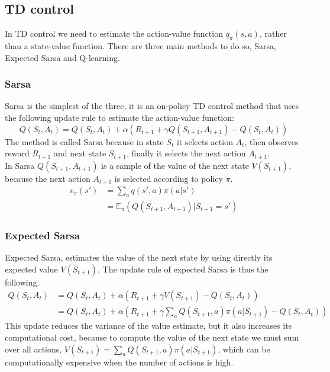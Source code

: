 \subsection{TD control}
In TD control we need to estimate the action-value function $q_{\pi}(s, a)$, rather than a state-value function. There are three main methods to do so, Sarsa, Expected Sarsa and Q-learning.

\subsubsection{Sarsa}
Sarsa is the simplest of the three, it is an on-policy TD control method that uses the following update rule to estimate the action-value function:
\begin{equation}
    Q(S_t, A_t) = Q(S_t, A_t) + \alpha (R_{t+1} + \gamma Q(S_{t+1}, A_{t+1}) - Q(S_t, A_t))
    \label{Sarsa-update}
\end{equation}
The method is called Sarsa because in state $S_t$ it selects action $A_t$, then observes reward $R_{t+1}$ and next state $S_{t+1}$, finally it selects the next action $A_{t+1}$.\\
In Sarsa $Q(S_{t+1}, A_{t+1})$ is a sample of the value of the next state $V(S_{t+1})$, because the next action $A_{t+1}$ is selected according to policy $\pi$.
\begin{equation*}
    \begin{split}
        v_{\pi}(s') & = \sum_a{q(s', a) \pi(a | s')} \\
        & = \mathds{E}_{\pi}(Q(S_{t+1}, A_{t+1}) | S_{t+1} = s')
    \end{split}
\end{equation*}

\subsubsection{Expected Sarsa}
Expected Sarsa, estimates the value of the next state by using directly its expected value $V(S_{t+1})$. The update rule of expected Sarsa is thus the following.
\begin{equation}
    \begin{split}
        Q(S_t, A_t) & = Q(S_t, A_t) + \alpha (R_{t+1} + \gamma V(S_{t+1}) - Q(S_t, A_t)) \\
        & = Q(S_t, A_t) + \alpha (R_{t+1} + \gamma \sum_a{Q(S_{t+1}, a) \pi(a | S_{t+1})} - Q(S_t, A_t))
    \end{split}
    \label{expected-Sarsa-update}
\end{equation}
This update reduces the variance of the value estimate, but it also increases its computational cost, because to compute the value of the next state we must sum over all actions, $V(S_{t+1}) = \sum_a{Q(S_{t+1}, a) \pi(a | S_{t+1})}$, which can be computationally expensive when the number of actions is high.

